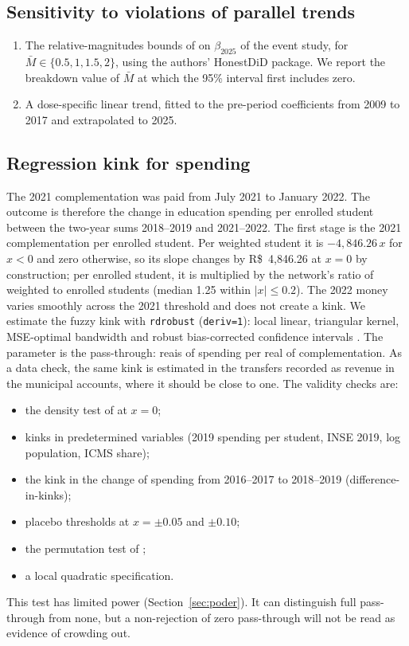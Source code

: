 \documentclass[11pt]{article}
\newcommand{\reais}{R\$}
\begin{document}
\subsection{Sensitivity to violations of parallel trends}\label{sec:sensibilidade}
\begin{enumerate}
\item The relative-magnitudes bounds of \citet{rambachan2023} on $\beta_{2025}$ of the event study, for $\bar M \in \{0.5, 1, 1.5, 2\}$, using the authors' HonestDiD package. We report the breakdown value of $\bar M$ at which the 95\% interval first includes zero.
\item A dose-specific linear trend, fitted to the pre-period coefficients from 2009 to 2017 and extrapolated to 2025.
\end{enumerate}

\subsection{Regression kink for spending}\label{sec:kink}
The 2021 complementation was paid from July 2021 to January 2022. The outcome is therefore the change in education spending per enrolled student between the two-year sums 2018--2019 and 2021--2022. The first stage is the 2021 complementation per enrolled student. Per weighted student it is $-4{,}846.26\,x$ for $x<0$ and zero otherwise, so its slope changes by \reais{}~4,846.26 at $x=0$ by construction; per enrolled student, it is multiplied by the network's ratio of weighted to enrolled students (median 1.25 within $|x| \le 0.2$). The 2022 money varies smoothly across the 2021 threshold and does not create a kink. We estimate the fuzzy kink with \texttt{rdrobust} (\texttt{deriv=1}): local linear, triangular kernel, MSE-optimal bandwidth and robust bias-corrected confidence intervals \citep{card2015, calonico2014}. The parameter is the pass-through: reais of spending per real of complementation. As a data check, the same kink is estimated in the transfers recorded as revenue in the municipal accounts, where it should be close to one. The validity checks are:
\begin{itemize}
\item the density test of \citet{cattaneo2020} at $x = 0$;
\item kinks in predetermined variables (2019 spending per student, INSE 2019, log population, ICMS share);
\item the kink in the change of spending from 2016--2017 to 2018--2019 (difference-in-kinks);
\item placebo thresholds at $x = \pm 0.05$ and $\pm 0.10$;
\item the permutation test of \citet{ganong2018};
\item a local quadratic specification.
\end{itemize}
This test has limited power (Section~\ref{sec:poder}). It can distinguish full pass-through from none, but a non-rejection of zero pass-through will not be read as evidence of crowding out.
\end{document}
